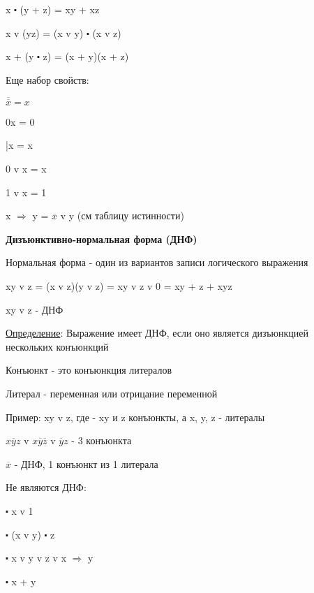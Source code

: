 \documentclass{article}
\begin{document}
 x $\centerdot$ (y + z) = xy + xz
 
 x v (yz) = (x v y) $\centerdot$ (x v z)
 
 x + (y $\centerdot$ z) \cancel = (x + y)(x + z)
 
 Еще набор свойств:
 
 $\overline{\overline{x}} = x$
 
 0x = 0
 
 |x = x
 
 0 v x = x
 
 1 v x = 1
 
 x $\Rightarrow$ y = $\overline{x}$ v y (см таблицу истинности)
 
 \textbf{Дизъюнктивно-нормальная форма (ДНФ)}
 
 Нормальная форма - один из вариантов записи логического выражения
 
 xy v z = (x v z)(y v z) = xy v z v 0 = xy + z + xyz

xy v z - ДНФ

\underline{Определение}: Выражение имеет ДНФ, если оно является дизъюнкцией нескольких конъюнкций

Конъюнкт - это конъюнкция литералов

Литерал - переменная или отрицание переменной

Пример: xy v z, где - xy и z конъюнкты, а x, y, z - литералы

 $x\overline{y}z$  v  $x\overline{y} \overline{z}$ v $\overline{y}z$ - 3 конъюнкта 

$\overline{x}$ - ДНФ, 1 конъюнкт из 1 литерала

Не являются ДНФ:

$\centerdot$ x v 1

$\centerdot$ (x v y) $\centerdot$ z

$\centerdot$ x v y v z v x $\Rightarrow$ y

$\centerdot$ x + y
 
\end{document}

